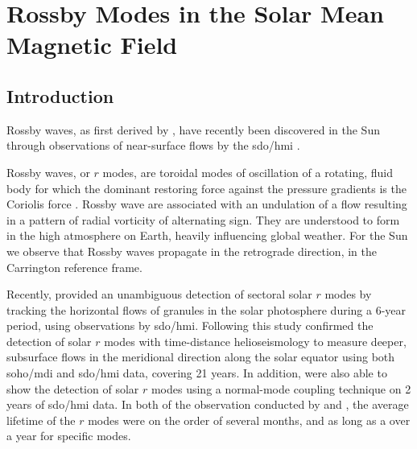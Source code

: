 \chapter{Rossby Modes in the Solar Mean Magnetic Field}\label{chap:rmode}

\section{Introduction}\label{sec:rmode_intro}


Rossby waves, as first derived by \citet{rossby_relation_1939}, have recently been discovered in the Sun through observations of near-surface flows by the \gls{sdo/hmi} \citep{loptien_global-scale_2018, liang_time-distance_2019}.

Rossby waves, or $r$ modes, are toroidal modes of oscillation of a rotating, fluid body for which the dominant restoring force against the pressure gradients is the Coriolis force \citep{lanza_sectoral_2019, hathaway_hydrodynamic_2020}. Rossby wave are associated with an undulation of a flow resulting in a pattern of radial vorticity of alternating sign. They are understood to form in the high atmosphere on Earth, heavily influencing global weather. For the Sun we observe that Rossby waves propagate in the retrograde direction, in the Carrington reference frame.

Recently, \citet{loptien_global-scale_2018} provided an unambiguous detection of sectoral solar $r$ modes by tracking the horizontal flows of granules in the solar photosphere during a 6-year period, using observations by \gls{sdo/hmi}. Following this study \citet{liang_time-distance_2019} confirmed the detection of solar $r$ modes with time-distance helioseismology to measure deeper, subsurface flows in the meridional direction along the solar equator using both \gls{soho/mdi} and \gls{sdo/hmi} data, covering 21 years. In addition, \citet{hanasoge_detection_2019} were also able to show the detection of solar $r$ modes using a normal-mode coupling technique on 2 years of \gls{sdo/hmi} data. In both of the observation conducted by \citet{loptien_global-scale_2018} and \citet{liang_time-distance_2019}, the average lifetime of the $r$ modes were on the order of several months, and as long as a over a year for specific modes.

